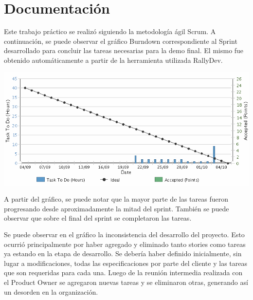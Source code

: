\section{Documentación}

Este trabajo práctico se realizó siguiendo la metodología ágil Scrum.
A continuación, se puede observar el gráfico Burndown correspondiente al Sprint
desarrollado para concluir las tareas necesarias para la demo final.
El mismo fue obtenido automáticamente a partir de la herramienta utilizada RallyDev.
\newline


\centerline{\includegraphics[width=1\textwidth]{./imagenes/burndown.png}}



A partir del gráfico, se puede notar que la mayor parte de las tareas fueron progresando
desde aproximadamente la mitad del sprint. 
También se puede observar que sobre el final del sprint se completaron las tareas.


Se puede observar en el gráfico la inconsistencia del desarrollo del proyecto. Esto ocurrió principalmente por haber agregado y eliminado
tanto stories como tareas ya estando en la etapa de desarrollo. Se debería haber definido inicialmente, sin lugar
a modificaciones, todas las especificaciones por parte del cliente y las tareas que son requeridas para cada una.
Luego de la reunión intermedia realizada con el Product Owner se agregaron nuevas tareas y se eliminaron otras,
generando así un desorden en la organización.